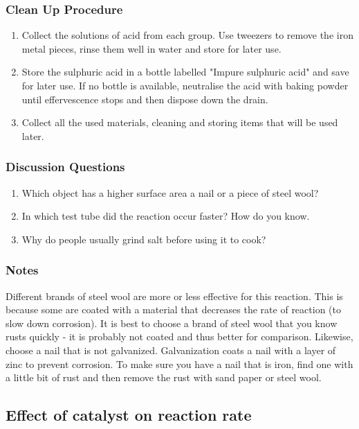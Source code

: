 \subsubsection*{Clean Up Procedure}
\begin{enumerate}
\item{Collect the solutions of acid from each group. Use tweezers to remove the iron metal pieces, rinse them well in water and store for later use.}
\item{Store the sulphuric acid in a bottle labelled "Impure sulphuric acid" and save for later use. If no bottle is available, neutralise the acid with baking powder until effervescence stops and then dispose down the drain.}
\item{Collect all the used materials, cleaning and storing items that will be used later.}
\end{enumerate}

\subsubsection*{Discussion Questions}
\begin{enumerate}
\item{Which object has a higher surface area a nail or a piece of steel wool?}
\item{In which test tube did the reaction occur faster? How do you know.}
\item{Why do people usually grind salt before using it to cook?}
\end{enumerate}

\subsubsection*{Notes}
Different brands of steel wool are more or less effective for this reaction. This is because some are coated with a material that decreases the rate of reaction (to slow down corrosion). It is best to choose a brand of steel wool that you know rusts quickly - it is probably not coated and thus better for comparison. Likewise, choose a nail that is not galvanized. Galvanization coats a nail with a layer of zinc to prevent corrosion. To make sure you have a nail that is iron, find one with a little bit of rust and then remove the rust with sand paper or steel wool.

\subsection{Effect of catalyst on reaction rate}


